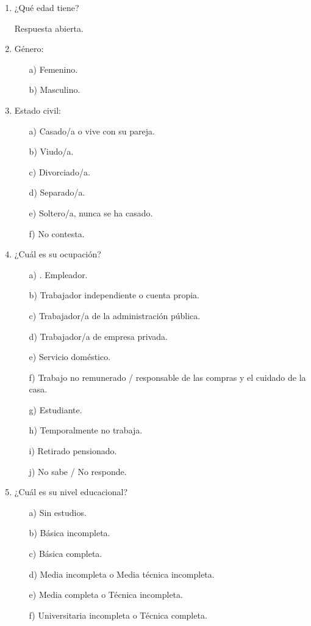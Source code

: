\begin{enumerate}
\item ¿Qué edad tiene?

Respuesta abierta.

\item Género:
\begin{itemize}
\item[a)] Femenino.
\item[b)]      Masculino.
\end{itemize}
\item Estado civil:
\begin{itemize}
\item[a)] Casado/a o vive con su pareja.
\item[b)] Viudo/a.
\item[c)] Divorciado/a.
\item[d)] Separado/a.
\item[e)] Soltero/a, nunca se ha casado.
\item[f)] No contesta.
\end{itemize}
\item ¿Cuál es su ocupación?
\begin{itemize}
\item[a)]. Empleador.
\item[b)] Trabajador independiente o cuenta propia.
\item[c)] Trabajador/a de la administración pública.
\item[d)] Trabajador/a de empresa privada.
\item[e)] Servicio doméstico.
\item[f)] Trabajo no remunerado / responsable de las compras y el cuidado de la casa.
\item[g)] Estudiante.
\item[h)]Temporalmente no trabaja.
\item[i)] Retirado pensionado.
\item[j)] No sabe / No responde.
\end{itemize}
\item ¿Cuál es su nivel educacional?
\begin{itemize}
\item[a)] Sin estudios.
\item[b)] Básica incompleta.
\item[c)] Básica completa.
\item[d)] Media incompleta o Media técnica incompleta.
\item[e)] Media completa o Técnica incompleta.
\item[f)] Universitaria incompleta o Técnica completa.

\end{itemize}
\end{enumerate}
